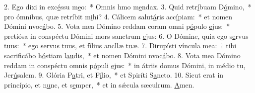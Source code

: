 2. Ego dixi in exc\uline{é}ssu m\uline{e}o:~* Omnis hmo m\uline{e}ndax.
3. Quid retr\uline{í}buam D\uline{ó}mino,~* pro ómnibus, quæ retríbit m\uline{i}hi?
4. Cálicem salut\uline{á}ris acc\uline{í}piam:~* et nomen Dómini nvoc\uline{á}bo.
5. Vota mea Dómino reddam coram omni p\uline{ó}pulo \uline{e}jus:~* pretiósa in conspéctu Dómini mors sanctrum \uline{e}jus:
6. O Dómine, quia ego s\uline{e}rvus t\uline{u}us:~* ego servus tuus, et fílius ancllæ t\uline{u}æ.
7. Dirupísti víncula mea:~† tibi sacrificábo h\uline{ó}stiam l\uline{au}dis,~* et nomen Dómini nvoc\uline{á}bo.
8. Vota mea Dómino reddam in conspéctu omnis p\uline{ó}puli \uline{e}jus:~* in átriis domus Dómini, in médio tu, Jer\uline{ú}salem.
9. Glória P\uline{a}tri, et F\uline{í}lio,~* et Spiríti S\uline{a}ncto.
10. Sicut erat in princípio, et n\uline{u}nc, et s\uline{e}mper,~* et in sǽcula sæculrum. \uline{A}men.
